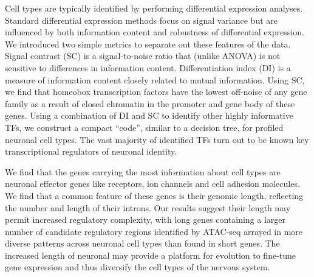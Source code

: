 
Cell types are typically identified by performing differential expression analyses. Standard differential expression methods focus on signal variance but are influenced by both information content and robustness of differential expression. We introduced two simple metrics to separate out these features of the data. Signal contrast (SC) is a signal-to-noise ratio that (unlike ANOVA) is not sensitive to differences in information content. Differentiation index (DI) is a measure of information content closely related to mutual information. Using SC, we find that homeobox transcription factors have the lowest off-noise of any gene family as a result of closed chromatin in the promoter and gene body of these genes. Using a combination of DI and SC to identify other highly informative TFs, we construct a compact “code”, similar to a decision tree, for profiled neuronal cell types. The vast majority of identified TFs turn out to be known key transcriptional regulators of neuronal identity.

We find that the genes carrying the most information about cell types are neuronal effector genes like receptors, ion channels and cell adhesion molecules. We find that a common feature of these genes is their genomic length, reflecting the number and length of their introns. %
Our results suggest their length may permit increased regulatory complexity, with long genes containing a larger number of candidate regulatory regions identified by ATAC-seq arrayed in more diverse patterns across neuronal cell types than found in short genes. The increased length of neuronal may provide a platform for evolution to fine-tune gene expression and thus diversify the cell types of the nervous system.
